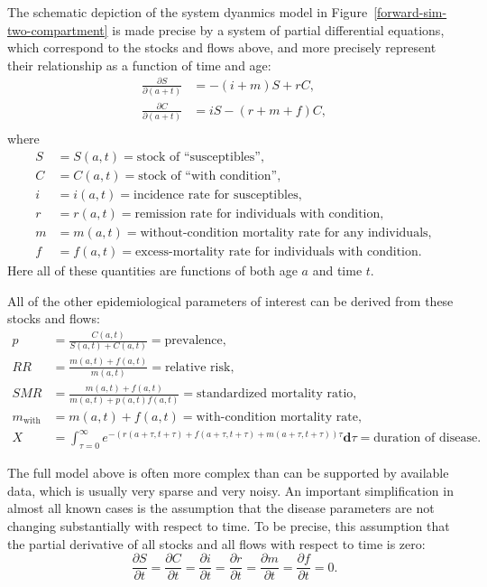 \documentclass[12pt]{article}
\newcommand{\1}{\mathbf{1}}
\newcommand{\0}{\mathbf{0}}
\renewcommand{\d}{\mathbf{d}}
\newcommand{\with}{\text{with}}
\begin{document}
The schematic depiction of the system dyanmics model in
Figure~\ref{forward-sim-two-compartment} is made precise by a system
of partial differential equations, which correspond to the stocks and
flows above, and more precisely represent their relationship as a
function of time and age:
\begin{align*}
\frac{\partial S}{\partial (a+t)} &= -(i + m)S + rC,\\
\frac{\partial C}{\partial (a+t)} &= iS - (r + m + f)C,\\
\end{align*}
where
\begin{align*}
S &= S(a,t) = \text{stock of ``susceptibles''},\\
C &= C(a,t) = \text{stock of ``with condition''},\\[.1in]
i &= i(a,t) = \text{incidence rate for susceptibles},\\
r &= r(a,t) = \text{remission rate for individuals with condition},\\
m &= m(a,t) = \text{without-condition mortality rate for any individuals},\\
f &= f(a,t) = \text{excess-mortality rate for individuals with
condition}.
\end{align*}
Here all of these quantities are functions of both age $a$ and time
$t$.

All of the other epidemiological parameters of interest can be derived from these stocks and flows:
\begin{align*}
p &= \frac{C(a,t)}{S(a,t)+C(a,t)} = \text{prevalence},\\
RR &= \frac{m(a,t)+f(a,t)}{m(a,t)} = \text{relative risk},\\
SMR &= \frac{m(a,t)+f(a,t)}{m(a,t)+p(a,t)f(a,t)} = \text{standardized mortality ratio},\\
m_\with &= m(a,t)+f(a,t) = \text{with-condition mortality rate},\\
X &= \int_{\tau = 0}^\infty e^{-\left(r(a+\tau, t+\tau) + f(a+\tau, t+\tau) + m(a+\tau, t+\tau)\right) \tau}\d \tau
= \text{duration of disease}.
\end{align*}

The full model above is often more complex than can be supported by
available data, which is usually very sparse and very noisy.  An
important simplification in almost all known cases is the assumption
that the disease parameters are not changing substantially with
respect to time. To be precise, this assumption that the partial
derivative of all stocks and all flows with respect to time is zero:
\[
\frac{\partial S}{\partial t}
=
\frac{\partial C}{\partial t}
=
\frac{\partial i}{\partial t}
=
\frac{\partial r}{\partial t}
=
\frac{\partial m}{\partial t}
=
\frac{\partial f}{\partial t}
=
0.
\]
\end{document}
